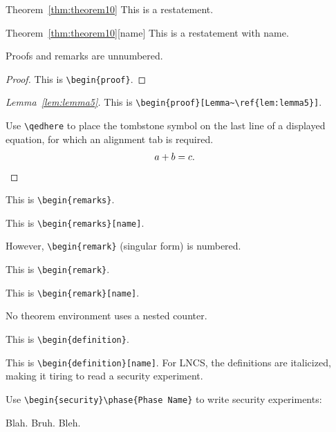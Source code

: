\begin{restated}{Theorem~\ref{thm:theorem10}}
This is a restatement.
\end{restated}

\begin{restated}{Theorem~\ref{thm:theorem10}}[name]
This is a restatement with name.
\end{restated}

\noindent
Proofs and remarks are unnumbered.

\begin{proof}
This is \texttt{\textbackslash begin\{proof\}}.
\end{proof}

\begin{proof}[Lemma~\ref{lem:lemma5}]
This is \texttt{\textbackslash begin\{proof\}[Lemma\textasciitilde\textbackslash ref\{lem:lemma5\}]}.

Use \texttt{\textbackslash qedhere} to place the tombstone symbol
on the last line of a displayed equation,
for which an alignment tab is required.
\begin{align*}
a+b&{}=c.
\qedhere
\end{align*}
\end{proof}

\begin{remarks}
This is \texttt{\textbackslash begin\{remarks\}}.
\end{remarks}

\begin{remarks}[name]
This is \texttt{\textbackslash begin\{remarks\}[name]}.
\end{remarks}

\noindent
However, \texttt{\textbackslash begin\{remark\}} (singular form) is numbered.

\begin{remark}
This is \texttt{\textbackslash begin\{remark\}}.
\end{remark}

\begin{remark}[name]
This is \texttt{\textbackslash begin\{remark\}[name]}.
\end{remark}

\noindent
No theorem environment uses a nested counter.

\begin{definition}
This is \texttt{\textbackslash begin\{definition\}}.
\end{definition}

\begin{definition}[name]
This is \texttt{\textbackslash begin\{definition\}[name]}.
For LNCS, the definitions are italicized,
making it tiring to read a security experiment.

Use \texttt{\textbackslash begin\{security\}\textbackslash phase\{Phase Name\}}
to write security experiments:
\begin{security}
 Blah.
 Bruh.
 Bleh.
\end{security}
\end{definition}


